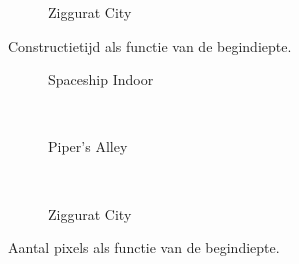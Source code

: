 \begin{figure}[t]
\begin{minipage}[t]{0.5\textwidth}
  \begin{adjustbox}{minipage=\textwidth, scale=0.55}
    \begin{subfigure}[b]{1.6\textwidth}
      \centering
      \def\svgwidth{\textwidth}
      
      \caption{Ziggurat City}
      \label{fig:hs-sd-construction:city}
    \end{subfigure}
  \end{adjustbox}
  \caption{\small Constructietijd als functie van de begindiepte.}
  \label{fig:hs-sd-construction}
  \end{minipage}%
  \begin{minipage}[t]{0.5\textwidth}
  \begin{adjustbox}{minipage=\textwidth, scale=0.55}
    \begin{subfigure}[b]{1.6\textwidth}
      \centering
      \def\svgwidth{\textwidth}
      
      \caption{Spaceship Indoor}
      \vspace{4pt}
      \label{fig:hs-sd-memory::indoor}
    \end{subfigure}
  \end{adjustbox} \\
  \begin{adjustbox}{minipage=\textwidth, scale=0.55}
    \begin{subfigure}[b]{1.6\textwidth}
      \centering
      \def\svgwidth{\textwidth}
      
      \caption{Piper's Alley}
      \vspace{4pt}
      \label{fig:hs-sd-memory:alley}
    \end{subfigure}
  \end{adjustbox} \\
  \begin{adjustbox}{minipage=\textwidth, scale=0.55}
    \begin{subfigure}[b]{1.6\textwidth}
      \centering
      \def\svgwidth{\textwidth}
      
      \caption{Ziggurat City}
      \label{fig:hs-sd-memory:city}
    \end{subfigure}
  \end{adjustbox}
  \caption{\small Aantal pixels als functie van de begindiepte.}
  \label{fig:hs-sd-memory}
  \end{minipage} 
\end{figure}

